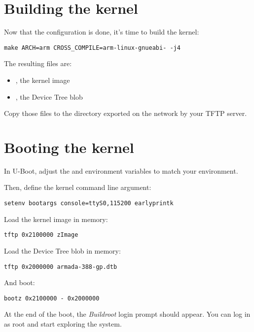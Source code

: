 \section{Building the kernel}

Now that the configuration is done, it's time to build the kernel:

\begin{verbatim}
make ARCH=arm CROSS_COMPILE=arm-linux-gnueabi- -j4
\end{verbatim}

The resulting files are:

\begin{itemize}
\item {}, the kernel image
\item {}, the Device Tree blob
\end{itemize}

Copy those files to the directory exported on the network by your TFTP
server.

\section{Booting the kernel}

In U-Boot, adjust the  and  environment
variables to match your environment.

Then, define the kernel command line argument:

\begin{verbatim}
setenv bootargs console=ttyS0,115200 earlyprintk
\end{verbatim}

Load the kernel image in memory:

\begin{verbatim}
tftp 0x2100000 zImage
\end{verbatim}

Load the Device Tree blob in memory:

\begin{verbatim}
tftp 0x2000000 armada-388-gp.dtb
\end{verbatim}

And boot:

\begin{verbatim}
bootz 0x2100000 - 0x2000000
\end{verbatim}

At the end of the boot, the {\em Buildroot} login prompt should
appear. You can log in as root and start exploring the system.

